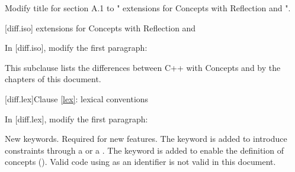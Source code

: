 \setcounter{chapter}{0}

Modify title for section A.1 to "\Cpp{} extensions for Concepts with Reflection
and {\cppstddocno}".

\setcounter{section}{0}
[diff.iso]{\Cpp{} extensions for Concepts with Reflection and {\cppstddocno}}

In {\cppstddocno} [diff.iso], modify the first paragraph:

\begin{std.txt}
This subclause lists the differences between C++ with  Concepts and {\cppstddocno} by the chapters of this document.
\end{std.txt}

[diff.lex]{Clause \ref{lex}: lexical conventions}

In {\cppstddocno} [diff.lex], modify the first paragraph:

\begin{std.txt}
\change New keywords.
\rationale Required for new features.
The  keyword is added
to introduce constraints through a  or
a . The  keyword is
added to enable the definition of concepts ().
\effect
Valid {\cppstddocno} code using \added{,} 
as an identifier is not valid in this document.
\end{std.txt}
